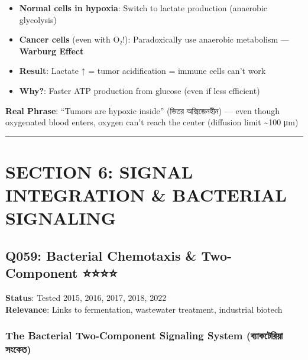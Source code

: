 \begin{itemize}
\tightlist
\item
  \textbf{Normal cells in hypoxia}: Switch to lactate production
  (anaerobic glycolysis)
\item
  \textbf{Cancer cells} (even with O₂!): Paradoxically use anaerobic
  metabolism --- \textbf{Warburg Effect}
\item
  \textbf{Result}: Lactate ↑ = tumor acidification = immune cells can't
  work
\item
  \textbf{Why?}: Faster ATP production from glucose (even if less
  efficient)
\end{itemize}

\textbf{Real Phrase}: ``Tumors are hypoxic inside'' (ভিতর অক্সিজেনহীন)
--- even though oxygenated blood enters, oxygen can't reach the center
(diffusion limit \textasciitilde100 μm)

\begin{center}\rule{0.5\linewidth}{0.5pt}\end{center}

\hypertarget{section-6-signal-integration-bacterial-signaling}{%
\chapter{SECTION 6: SIGNAL INTEGRATION \& BACTERIAL
SIGNALING}\label{section-6-signal-integration-bacterial-signaling}}

\hypertarget{q059-bacterial-chemotaxis-two-component}{%
\section{Q059: Bacterial Chemotaxis \& Two-Component
⭐⭐⭐⭐}\label{q059-bacterial-chemotaxis-two-component}}

\textbf{Status}: Tested 2015, 2016, 2017, 2018, 2022\\
\textbf{Relevance}: Links to fermentation, wastewater treatment,
industrial biotech

\hypertarget{the-bacterial-two-component-signaling-system-ux9acux9afux995ux99fux9b0ux9af-ux9b8ux995ux9a4}{%
\subsection{\texorpdfstring{\textbf{The Bacterial Two-Component
Signaling System} (ব্যাকটেরিয়া
সংকেত)}{The Bacterial Two-Component Signaling System (ব্যাকটেরিয়া সংকেত)}}\label{the-bacterial-two-component-signaling-system-ux9acux9afux995ux99fux9b0ux9af-ux9b8ux995ux9a4}}

